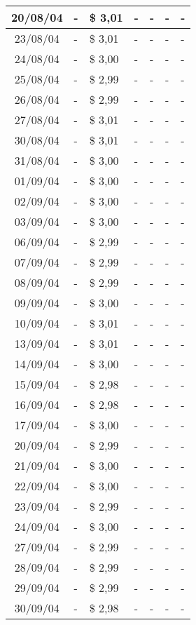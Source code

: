 \begin{center}
\begin{longtable}{|c|p{1.5cm}|p{1.5cm}|p{1.5cm}|p{1.5cm}|p{1.5cm}|p{1.5cm}|}
20/08/04 & - & \$ 3,01 & - & - & - & - \\ \hline
23/08/04 & - & \$ 3,01 & - & - & - & - \\ \hline
24/08/04 & - & \$ 3,00 & - & - & - & - \\ \hline
25/08/04 & - & \$ 2,99 & - & - & - & - \\ \hline
26/08/04 & - & \$ 2,99 & - & - & - & - \\ \hline
27/08/04 & - & \$ 3,01 & - & - & - & - \\ \hline
30/08/04 & - & \$ 3,01 & - & - & - & - \\ \hline
31/08/04 & - & \$ 3,00 & - & - & - & - \\ \hline
01/09/04 & - & \$ 3,00 & - & - & - & - \\ \hline
02/09/04 & - & \$ 3,00 & - & - & - & - \\ \hline
03/09/04 & - & \$ 3,00 & - & - & - & - \\ \hline
06/09/04 & - & \$ 2,99 & - & - & - & - \\ \hline
07/09/04 & - & \$ 2,99 & - & - & - & - \\ \hline
08/09/04 & - & \$ 2,99 & - & - & - & - \\ \hline
09/09/04 & - & \$ 3,00 & - & - & - & - \\ \hline
10/09/04 & - & \$ 3,01 & - & - & - & - \\ \hline
13/09/04 & - & \$ 3,01 & - & - & - & - \\ \hline
14/09/04 & - & \$ 3,00 & - & - & - & - \\ \hline
15/09/04 & - & \$ 2,98 & - & - & - & - \\ \hline
16/09/04 & - & \$ 2,98 & - & - & - & - \\ \hline
17/09/04 & - & \$ 3,00 & - & - & - & - \\ \hline
20/09/04 & - & \$ 2,99 & - & - & - & - \\ \hline
21/09/04 & - & \$ 3,00 & - & - & - & - \\ \hline
22/09/04 & - & \$ 3,00 & - & - & - & - \\ \hline
23/09/04 & - & \$ 2,99 & - & - & - & - \\ \hline
24/09/04 & - & \$ 3,00 & - & - & - & - \\ \hline
27/09/04 & - & \$ 2,99 & - & - & - & - \\ \hline
28/09/04 & - & \$ 2,99 & - & - & - & - \\ \hline
29/09/04 & - & \$ 2,99 & - & - & - & - \\ \hline
30/09/04 & - & \$ 2,98 & - & - & - & - \\ \hline

\end{longtable}
\end{center}
